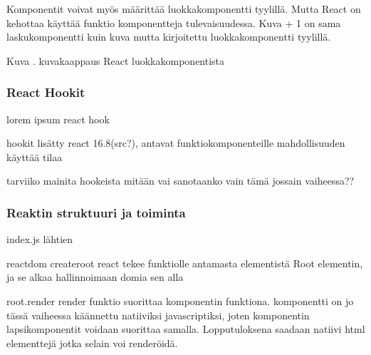Komponentit voivat myös määrittää luokkakomponentti tyylillä. Mutta React on kehottaa käyttää funktio komponentteja tulevaisuudessa.
Kuva {\the\numexpr \theimgCounter + 1}{} on sama laskukomponentti kuin kuva \theimgCounter{} mutta kirjoitettu luokkakomponentti tyylillä. 
\medskip
\bigskip


Kuva \getImgCount{}. kuvakaappaus React luokkakomponentista
\medskip





\subsubsection{React Hookit}

lorem ipsum react hook

hookit lisätty react 16.8(src?), antavat funktiokomponenteille mahdollisuuden käyttää tilaa

tarviiko mainita hookeista mitään vai sanotaanko vain tämä jossain vaiheessa??









\medskip

\subsubsection{Reaktin struktuuri ja toiminta}


index.js lähtien




reactdom createroot
react tekee funktiolle antamasta elementistä Root elementin, ja se alkaa hallinnoimaan domia sen alla
\medskip


root.render
render funktio suorittaa komponentin funktiona. komponentti on jo tässä vaiheessa käännettu natiiviksi javascriptiksi, 
joten komponentin lapsikomponentit voidaan suorittaa samalla. Lopputuloksena saadaan natiivi html elementtejä jotka selain voi renderöidä.

